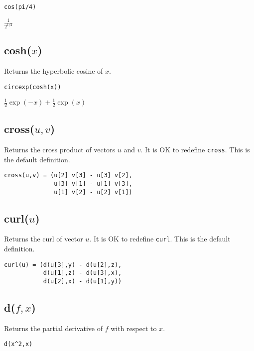 {\color{blue}
\begin{verbatim}
cos(pi/4)
\end{verbatim}
}

\noindent
$\displaystyle \frac{1}{2^{1/2}}$

\subsection*{cosh($x$)}

Returns the hyperbolic cosine of $x$.

{\color{blue}
\begin{verbatim}
circexp(cosh(x))
\end{verbatim}
}

\noindent
$\tfrac{1}{2}\exp(-x)+\tfrac{1}{2}\exp(x)$


\subsection*{cross($u,v$)}

Returns the cross product of vectors $u$ and $v$.
It is OK to redefine {\tt cross}.
This is the default definition.

{\color{blue}
\begin{verbatim}
cross(u,v) = (u[2] v[3] - u[3] v[2],
              u[3] v[1] - u[1] v[3],
              u[1] v[2] - u[2] v[1])
\end{verbatim}
}

\subsection*{curl($u$)}

Returns the curl of vector $u$.
It is OK to redefine {\tt curl}.
This is the default definition.

{\color{blue}
\begin{verbatim}
curl(u) = (d(u[3],y) - d(u[2],z),
           d(u[1],z) - d(u[3],x),
           d(u[2],x) - d(u[1],y))
\end{verbatim}
}

\subsection*{d($f,x$)}

Returns the partial derivative of $f$ with respect to $x$.

{\color{blue}
\begin{verbatim}
d(x^2,x)
\end{verbatim}
}

